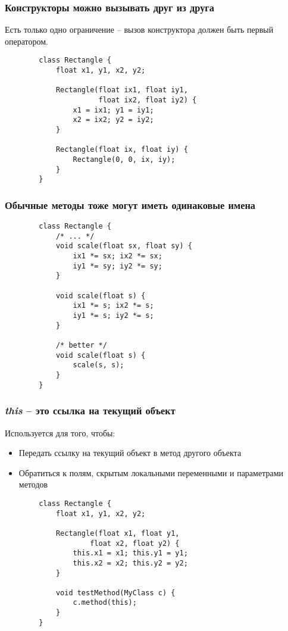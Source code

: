 

\begin{frame}[fragile]
	\frametitle{Конструкторы можно вызывать друг из друга}
	{\large Есть только одно ограничение -- вызов конструктора должен быть первый оператором.}

	\medskip
	\begin{verbatim}
		class Rectangle {
		    float x1, y1, x2, y2;

		    Rectangle(float ix1, float iy1,
		              float ix2, float iy2) {
		        x1 = ix1; y1 = iy1;
		        x2 = ix2; y2 = iy2;
		    }

		    Rectangle(float ix, float iy) {
		        Rectangle(0, 0, ix, iy);
		    }
		}
	\end{verbatim}

\end{frame}

\begin{frame}[fragile]
	\frametitle{Обычные методы тоже могут иметь одинаковые имена}

	\begin{large}
	\begin{verbatim}
		class Rectangle {
		    /* ... */
		    void scale(float sx, float sy) {
		        ix1 *= sx; ix2 *= sx;
		        iy1 *= sy; iy2 *= sy;
		    }

		    void scale(float s) {
		        ix1 *= s; ix2 *= s;
		        iy1 *= s; iy2 *= s;
		    }

		    /* better */
		    void scale(float s) {
		        scale(s, s);
		    }
		}
	\end{verbatim}
	\end{large}
\end{frame}

\begin{frame}[fragile]
	\frametitle{\textit{this} -- это ссылка на текущий объект}

	\begin{large}
	Используется для того, чтобы:
	\begin{itemize}
	\item{Передать ссылку на текущий объект в метод другого объекта}
	\item{Обратиться к полям, скрытым локальными переменными и параметрами методов}
	\end{itemize}
	\end{large}

	\begin{verbatim}
		class Rectangle {
		    float x1, y1, x2, y2;

		    Rectangle(float x1, float y1,
		            float x2, float y2) {
		        this.x1 = x1; this.y1 = y1;
		        this.x2 = x2; this.y2 = y2;
		    }
		
		    void testMethod(MyClass c) {
		        c.method(this);
		    }
		}
	\end{verbatim}
\end{frame}


